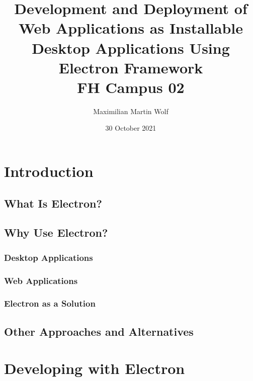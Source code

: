 \documentclass[11pt]{article}
\title{
        {Development and Deployment of Web Applications as Installable Desktop Applications Using
    Electron Framework}\\
    {\large FH Campus 02}\\
}
\author{Maximilian Martin Wolf}
\date{30 October 2021}
\begin{document}
    \maketitle
    \pagebreak
    \tableofcontents
    \pagebreak


    \section{Introduction}\label{sec:introduction}
    \setcounter{tocdepth}{3}

    \subsection{What Is Electron?}\label{subsec:what-is-electron}
    
    \clearpage

    \subsection{Why Use Electron?}\label{subsec:why-use-electron}
    
    \clearpage

    \subsubsection{Desktop Applications}\label{subsubsec:desktop-applications}
    
    \clearpage

    \subsubsection{Web Applications}\label{subsubsec:web-applications}
    
    \clearpage

    \subsubsection{Electron as a Solution}\label{subsubsec:electron-as-solution}
    
    \clearpage

    \subsection{Other Approaches and Alternatives}\label{subsec:alternatives}
    
    \clearpage

    \section{Developing with Electron}\label{sec:method}
    
    
    
    
\end{document}
